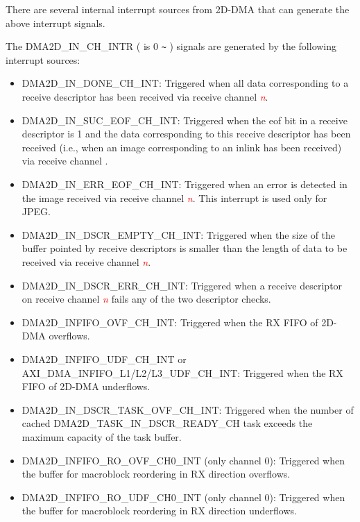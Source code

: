 \documentclass[main\_\_EN.tex]{subfiles}
\begin{document}
There are several internal interrupt sources from 2D-DMA that can generate the above interrupt signals.

The DMA2D\_IN\_CH\_INTR ( is 0 \verb+~+ ) signals are generated by the following interrupt sources:

\begin{itemize}
    \item \label{int:DMA2DINDONEINT}DMA2D\_IN\_DONE\_CH\_INT: Triggered when all data corresponding to a receive descriptor has been received via receive channel \textcolor{red}{\it{n}}.
    \item \label{int:DMA2DINSUCEOFINT}DMA2D\_IN\_SUC\_EOF\_CH\_INT: Triggered when the eof bit in a receive descriptor is 1 and the data corresponding to this receive descriptor has been received (i.e., when an image corresponding to an inlink has been received) via receive channel .
    \item \label{int:DMA2DINERREOFINT}DMA2D\_IN\_ERR\_EOF\_CH\_INT: Triggered when an error is detected in the image received via receive channel \textcolor{red}{\it{n}}. This interrupt is used only for JPEG.
    \item \label{int:DMA2DINDSCREMPTYINT}DMA2D\_IN\_DSCR\_EMPTY\_CH\_INT: Triggered when the size of the buffer pointed by receive descriptors is smaller than the length of data to be received via receive channel \textcolor{red}{\it{n}}.
    \item \label{int:DMA2DINDSCRERRINT}DMA2D\_IN\_DSCR\_ERR\_CH\_INT: Triggered when a receive descriptor on receive channel \textcolor{red}{\it{n}} fails any of the two descriptor checks.
    \item \label{int:DMA2DINFIFOOVFINT}DMA2D\_INFIFO\_OVF\_CH\_INT: Triggered when the RX FIFO of 2D-DMA overflows.
    \item \label{int:DMA2DINFIFOUDFINT}DMA2D\_INFIFO\_UDF\_CH\_INT or AXI\_DMA\_INFIFO\_L1/L2/L3\_UDF\_CH\_INT: Triggered when the RX FIFO of 2D-DMA underflows.
    \item \label{int:DMA2DINDSCRTASKOVFINT} DMA2D\_IN\_DSCR\_TASK\_OVF\_CH\_INT: Triggered when the number of cached DMA2D\_TASK\_IN\_DSCR\_READY\_CH task exceeds the maximum capacity of the task buffer.
    \item \label{int:DMA2DINFIFOROOVFINT} DMA2D\_INFIFO\_RO\_OVF\_CH0\_INT (only channel 0): Triggered when the buffer for macroblock reordering in RX direction overflows.
    \item \label{int:DMA2DINFIFOROUDFINT} DMA2D\_INFIFO\_RO\_UDF\_CH0\_INT (only channel 0): Triggered when the buffer for macroblock reordering in RX direction underflows.
\end{itemize}
\end{document}
